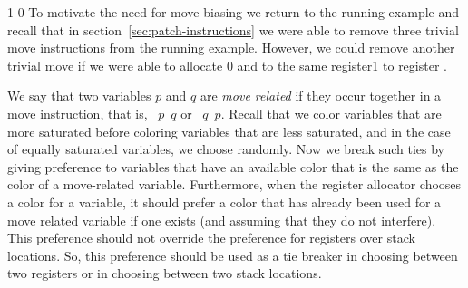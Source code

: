 \documentclass[7x10]{TimesAPriori_MIT}%
\def\pythonEd{1}
\def\edition{1}
\def\xeightysixEd{0}
\def\riscvEd{1}
\def\architecture{1}
\newcommand\ifriscv[1]{\if\architecture\riscvEd{#1}\fi}
\newcommand\ifxeightsix[1]{\if\architecture\xeightysixEd{#1}\fi}
\newcommand{\pythonColor}[0]{}
\numberwithin{theorem}{chapter}
\numberwithin{definition}{chapter}
\numberwithin{equation}{chapter}
\begin{document}
{\if\edition\pythonEd\pythonColor
{\if\architecture\xeightysixEd
%
To motivate the need for move biasing we return to the running example
and recall that in section~\ref{sec:patch-instructions} we were able to
remove three trivial move instructions from the running
example. However, we could remove another trivial move if we were able
to allocate \ifxeightsix{ and  to the same
  register}\ifriscv{ to register }.
\fi}
\fi}

We say that two variables $p$ and $q$ are \emph{move
related} if they occur together in
a move instruction, that is, \IMOVE~$p$\key{,}~$q$ or
\IMOVE~$q$\key{,}~$p$.
%
Recall that we color variables that are more saturated before coloring
variables that are less saturated, and in the case of equally
saturated variables, we choose randomly. Now we break such ties by
giving preference to variables that have an available color that is
the same as the color of a move-related variable.
%
Furthermore, when the register allocator chooses a color for a
variable, it should prefer a color that has already been used for a
move related variable if one exists (and assuming that they do not
interfere). This preference should not override the preference for
registers over stack locations. So, this preference should be used as
a tie breaker in choosing between two registers or in choosing between
two stack locations.
\end{document}
